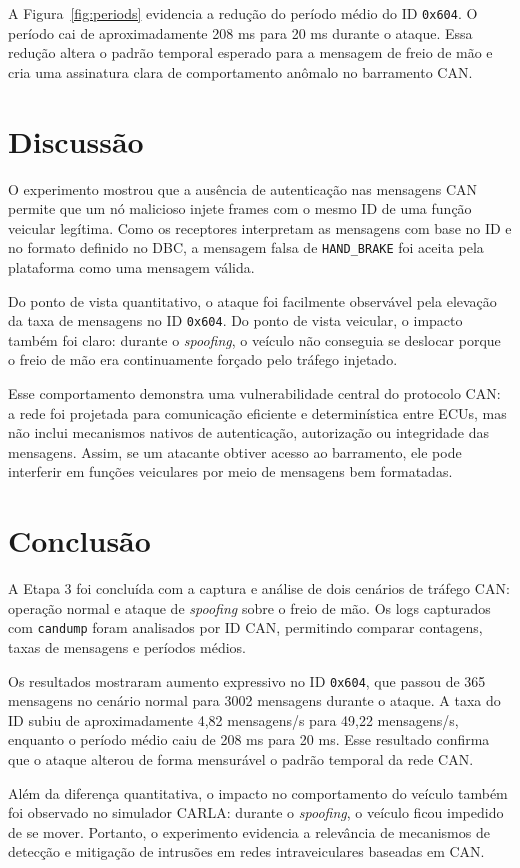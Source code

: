 \documentclass[12pt,a4paper]{article}
\begin{document}
A Figura~\ref{fig:periods} evidencia a redu\c{c}\~ao do per\'iodo m\'edio do ID
\texttt{0x604}. O per\'iodo cai de aproximadamente 208 ms para 20 ms durante o ataque.
Essa redu\c{c}\~ao altera o padr\~ao temporal esperado para a mensagem de freio de m\~ao
e cria uma assinatura clara de comportamento an\^omalo no barramento CAN.

\section{Discuss\~ao}

O experimento mostrou que a aus\^encia de autentica\c{c}\~ao nas mensagens CAN permite
que um n\'o malicioso injete frames com o mesmo ID de uma fun\c{c}\~ao veicular leg\'itima.
Como os receptores interpretam as mensagens com base no ID e no formato definido no
DBC, a mensagem falsa de \texttt{HAND\_BRAKE} foi aceita pela plataforma como uma
mensagem v\'alida.

Do ponto de vista quantitativo, o ataque foi facilmente observ\'avel pela eleva\c{c}\~ao
da taxa de mensagens no ID \texttt{0x604}. Do ponto de vista veicular, o impacto tamb\'em
foi claro: durante o \textit{spoofing}, o ve\'iculo n\~ao conseguia se deslocar porque o freio
de m\~ao era continuamente for\c{c}ado pelo tr\'afego injetado.

Esse comportamento demonstra uma vulnerabilidade central do protocolo CAN: a rede
foi projetada para comunica\c{c}\~ao eficiente e determin\'istica entre ECUs, mas n\~ao
inclui mecanismos nativos de autentica\c{c}\~ao, autoriza\c{c}\~ao ou integridade das
mensagens. Assim, se um atacante obtiver acesso ao barramento, ele pode interferir em
fun\c{c}\~oes veiculares por meio de mensagens bem formatadas.

\section{Conclus\~ao}

A Etapa 3 foi conclu\'ida com a captura e an\'alise de dois cen\'arios de tr\'afego CAN:
opera\c{c}\~ao normal e ataque de \textit{spoofing} sobre o freio de m\~ao. Os logs
capturados com \texttt{candump} foram analisados por ID CAN, permitindo comparar
contagens, taxas de mensagens e per\'iodos m\'edios.

Os resultados mostraram aumento expressivo no ID \texttt{0x604}, que passou de 365
mensagens no cen\'ario normal para 3002 mensagens durante o ataque. A taxa do ID
subiu de aproximadamente 4,82 mensagens/s para 49,22 mensagens/s, enquanto o per\'iodo
m\'edio caiu de 208 ms para 20 ms. Esse resultado confirma que o ataque alterou de forma
mensur\'avel o padr\~ao temporal da rede CAN.

Al\'em da diferen\c{c}a quantitativa, o impacto no comportamento do ve\'iculo tamb\'em
foi observado no simulador CARLA: durante o \textit{spoofing}, o ve\'iculo ficou impedido
de se mover. Portanto, o experimento evidencia a relev\^ancia de mecanismos de detec\c{c}\~ao
e mitiga\c{c}\~ao de intrus\~oes em redes intraveiculares baseadas em CAN.
\end{document}
